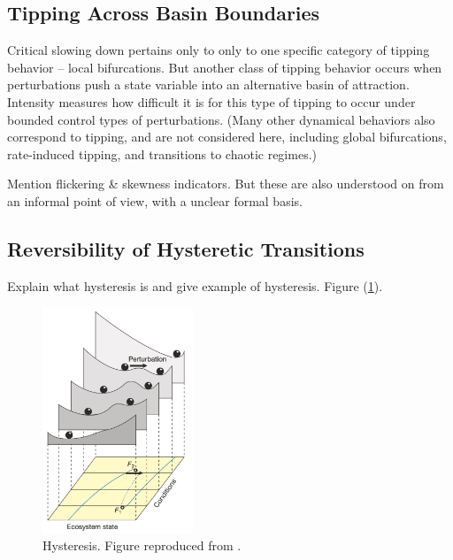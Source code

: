 \subsection{Tipping Across Basin Boundaries}

Critical slowing down pertains only to only to one specific category of tipping behavior – local bifurcations. But another class of tipping behavior occurs when perturbations push a state variable into an alternative basin of attraction. Intensity measures how difficult it is for this type of tipping to occur under bounded control types of perturbations. (Many other dynamical behaviors also correspond to tipping, and are not considered here, including global bifurcations, rate-induced tipping, and transitions to chaotic regimes.)

Mention flickering & skewness indicators. But these are also understood on from an informal point of view, with a unclear formal basis. 

\subsection{Reversibility of Hysteretic Transitions}

Explain what hysteresis is and give example of hysteresis. Figure (\ref{fig:hysteresis}).

\begin{figure}[ht]
	\centering
	\captionsetup{width=0.4\linewidth}
	\includegraphics[width=0.4\textwidth]{figs/hysteresis}
	\caption{Hysteresis. Figure reproduced from \cite{schefferCatastrophicShiftsEcosystems2001a}.}
	
	\label{fig:hysteresis}
\end{figure} 


